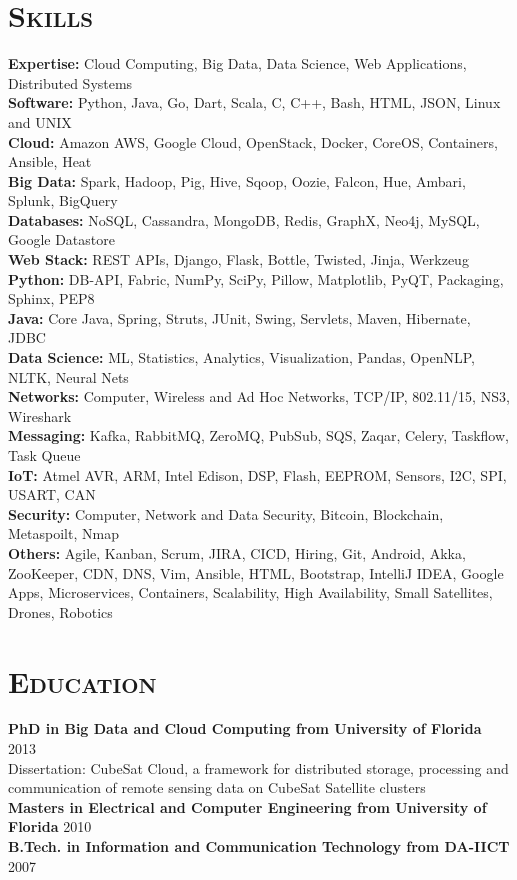 \begin{resume}
\section{\textsc{Skills}}
{\bf Expertise:} Cloud Computing, Big Data, Data Science, Web Applications, Distributed Systems
\\ {\bf Software:} Python, Java, Go, Dart, Scala, C, C++, Bash, HTML, JSON, Linux and UNIX
\\ {\bf Cloud:} Amazon AWS, Google Cloud, OpenStack, Docker, CoreOS, Containers, Ansible, Heat
\\ {\bf Big Data:} Spark, Hadoop, Pig, Hive, Sqoop, Oozie, Falcon, Hue, Ambari, Splunk, BigQuery
\\ {\bf Databases:} NoSQL, Cassandra, MongoDB, Redis, GraphX, Neo4j, MySQL, Google Datastore
\\ {\bf Web Stack:} REST APIs, Django, Flask, Bottle, Twisted, Jinja, Werkzeug
\\ {\bf Python:} DB-API, Fabric, NumPy, SciPy, Pillow, Matplotlib, PyQT, Packaging, Sphinx, PEP8
\\ {\bf Java:} Core Java, Spring, Struts, JUnit, Swing, Servlets, Maven, Hibernate, JDBC
\\ {\bf Data Science:} ML, Statistics, Analytics, Visualization, Pandas, OpenNLP, NLTK, Neural Nets
\\ {\bf Networks:} Computer, Wireless and Ad Hoc Networks, TCP/IP, 802.11/15, NS3, Wireshark
\\ {\bf Messaging:} Kafka, RabbitMQ, ZeroMQ, PubSub, SQS, Zaqar, Celery, Taskflow, Task Queue
\\ {\bf IoT:} Atmel AVR, ARM, Intel Edison, DSP, Flash, EEPROM, Sensors, I2C, SPI, USART, CAN
\\ {\bf Security:} Computer, Network and Data Security, Bitcoin, Blockchain, Metaspoilt, Nmap
\\ {\bf Others:} Agile, Kanban, Scrum, JIRA, CICD, Hiring, Git, Android, Akka, ZooKeeper, CDN, DNS, Vim, Ansible, HTML, Bootstrap, IntelliJ IDEA, Google Apps, Microservices, Containers, Scalability, High Availability, Small Satellites, Drones, Robotics

\section{\textsc{Education}}
\textbf{PhD in Big Data and Cloud Computing from University of Florida} \hfill 2013 \\
Dissertation: CubeSat Cloud, a framework for distributed storage, processing and communication of remote sensing data on CubeSat Satellite clusters\\
\textbf{Masters in Electrical and Computer Engineering from University of Florida} \hfill 2010 \\
\textbf{B.Tech. in Information and Communication Technology from DA-IICT} \hfill 2007


\end{resume}
